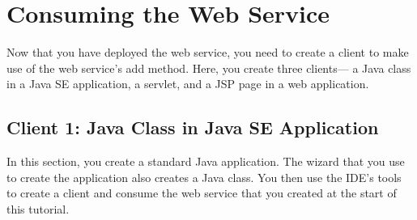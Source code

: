 \section{Consuming the Web Service}
Now that you have deployed the web service, you need to create a client to make use of the web service's add method. Here, you create three clients— a Java class in a Java SE application, a servlet, and a JSP page in a web application.

\subsection{Client 1: Java Class in Java SE Application}
In this section, you create a standard Java application. The wizard that you use to create the application also creates a Java class. You then use the IDE's tools to create a client and consume the web service that you created at the start of this tutorial.
